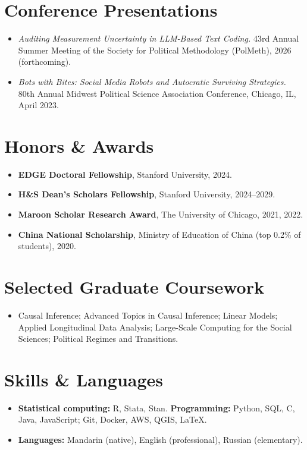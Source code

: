 \documentclass[letterpaper,10.5pt]{article}
\newcommand{\resumeSubHeadingListStart}{\begin{itemize}[leftmargin=0.15in, label={}]}
\newcommand{\resumeSubHeadingListEnd}{\end{itemize}}
\begin{document}

\section{Conference Presentations}
  \vspace{1pt}
  \resumeSubHeadingListStart
    \small\item \textit{Auditing Measurement Uncertainty in LLM-Based Text Coding.} 43rd Annual Summer Meeting of the Society for Political Methodology (PolMeth), 2026 (forthcoming).
    \small\item \textit{Bots with Bites: Social Media Robots and Autocratic Surviving Strategies.} 80th Annual Midwest Political Science Association Conference, Chicago, IL, April 2023.
  \resumeSubHeadingListEnd



\section{Honors \& Awards}
  \vspace{1pt}
  \resumeSubHeadingListStart
    \small\item \textbf{EDGE Doctoral Fellowship}, Stanford University, 2024.
    \small\item \textbf{H\&S Dean's Scholars Fellowship}, Stanford University, 2024--2029.
    \small\item \textbf{Maroon Scholar Research Award}, The University of Chicago, 2021, 2022.
    \small\item \textbf{China National Scholarship}, Ministry of Education of China (top 0.2\% of students), 2020.
  \resumeSubHeadingListEnd



\section{Selected Graduate Coursework}
  \vspace{1pt}
  \resumeSubHeadingListStart
    \small\item Causal Inference; Advanced Topics in Causal Inference; Linear Models; Applied Longitudinal Data Analysis; Large-Scale Computing for the Social Sciences; Political Regimes and Transitions.
  \resumeSubHeadingListEnd



\section{Skills \& Languages}
  \vspace{1pt}
  \resumeSubHeadingListStart
    \small\item \textbf{Statistical computing:} R, Stata, Stan. \textbf{Programming:} Python, SQL, C, Java, JavaScript; Git, Docker, AWS, QGIS, \LaTeX.
    \small\item \textbf{Languages:} Mandarin (native), English (professional), Russian (elementary).
  \resumeSubHeadingListEnd


\end{document}
